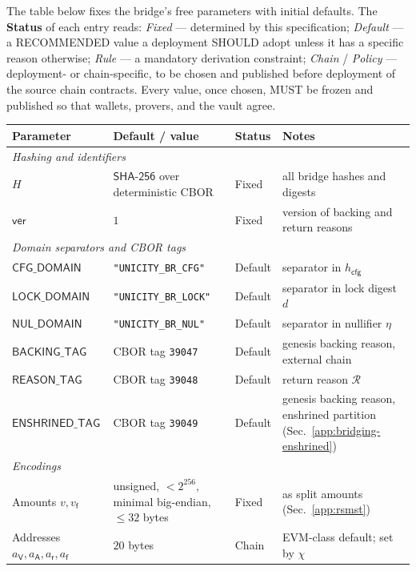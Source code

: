 The table below fixes the bridge's free parameters with initial defaults. The \textbf{Status} of each entry reads: \emph{Fixed} --- determined by this specification; \emph{Default} --- a RECOMMENDED value a deployment SHOULD adopt unless it has a specific reason otherwise; \emph{Rule} --- a mandatory derivation constraint; \emph{Chain} / \emph{Policy} --- deployment- or chain-specific, to be chosen and published before deployment of the source chain contracts. Every value, once chosen, MUST be frozen and published so that wallets, provers, and the vault agree.

\begin{longtable}{p{3.0cm}p{4.2cm}p{2.0cm}p{3.4cm}}
\textbf{Parameter} & \textbf{Default / value} & \textbf{Status} & \textbf{Notes} \\
\hline
\endhead
\multicolumn{4}{l}{\textit{Hashing and identifiers}}\\
\hline
$H$ & $\mathsf{SHA\text{-}256}$ over deterministic CBOR & Fixed & all bridge hashes and digests \\
$\mathsf{ver}$ & $1$ & Fixed & version of backing and return reasons \\
\hline
\multicolumn{4}{l}{\textit{Domain separators and CBOR tags}}\\
\hline
$\mathsf{CFG\_DOMAIN}$    & \texttt{"UNICITY\_BR\_CFG"}  & Default & separator in $h_\mathsf{cfg}$ \\
$\mathsf{LOCK\_DOMAIN}$   & \texttt{"UNICITY\_BR\_LOCK"} & Default & separator in lock digest $d$ \\
$\mathsf{NUL\_DOMAIN}$    & \texttt{"UNICITY\_BR\_NUL"}  & Default & separator in nullifier $\eta$ \\
$\mathsf{BACKING\_TAG}$   & CBOR tag \texttt{39047}        & Default & genesis backing reason, external chain \\
$\mathsf{REASON\_TAG}$    & CBOR tag \texttt{39048}        & Default & return reason $\mathcal{R}$ \\
$\mathsf{ENSHRINED\_}\allowbreak\mathsf{TAG}$ & CBOR tag \texttt{39049}        & Default & genesis backing reason, enshrined partition (Sec.~\ref{app:bridging-enshrined}) \\
\hline
\multicolumn{4}{l}{\textit{Encodings}}\\
\hline
Amounts $v,v_\mathsf{f}$ & unsigned, $<2^{256}$, minimal big-endian, $\le 32$ bytes & Fixed & as split amounts (Sec.~\ref{app:rsmst}) \\
Addresses $a_\mathsf{V},a_\mathsf{A},a_\mathsf{r},a_\mathsf{f}$ & $20$ bytes & Chain & EVM-class default; set by $\chi$ \\

\end{longtable}
